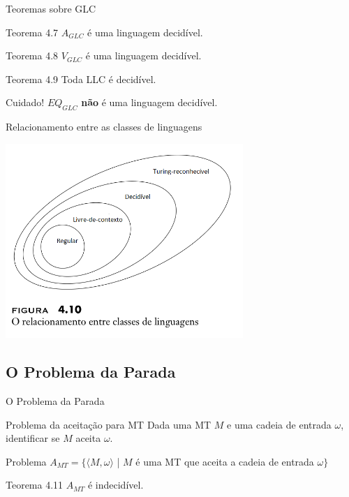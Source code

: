 \documentclass[xcolor=dvipsnames,table]{beamer}
\begin{document}
	\begin{frame}{Teoremas sobre GLC}
		\begin{block}{Teorema 4.7}
			$A_{GLC}$ é uma linguagem decidível.
		\end{block}
		\begin{block}{Teorema 4.8}
			$V_{GLC}$ é uma linguagem decidível.
		\end{block}
		\begin{block}{Teorema 4.9}
			Toda LLC é decidível.
		\end{block} \pause
		\begin{alertblock}{Cuidado!}
			$EQ_{GLC}$ {\color{red} {\bf não}} é uma linguagem decidível.
		\end{alertblock}
	\end{frame}
	
	\begin{frame}{Relacionamento entre as classes de linguagens}
		\begin{center}
			\includegraphics[width=9cm]{images/fig410.png}
		\end{center}
	\end{frame}
	
	\subsection{O Problema da Parada}
	\begin{frame}{O Problema da Parada}
		\begin{block}{Problema da aceitação para MT}
			Dada uma MT $M$ e uma cadeia de entrada $\omega$, identificar se $M$ aceita $\omega$.
		\end{block}	\pause
		\begin{block}{Problema}
			$A_{MT} = \{ \langle M, \omega \rangle$  | $M$ é uma MT que aceita a cadeia de entrada $\omega \}$
		\end{block} \pause
		\begin{alertblock}{Teorema 4.11}
			$A_{MT}$ é indecidível.
		\end{alertblock}
	\end{frame}
	
\end{document}
